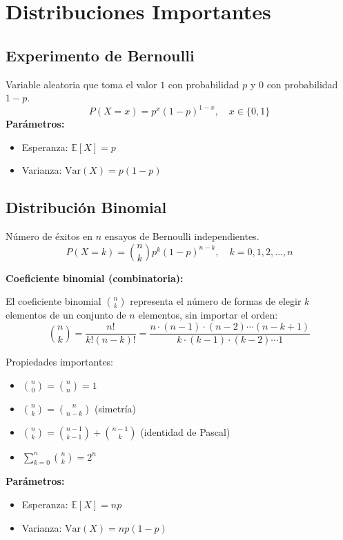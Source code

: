 \documentclass[12pt,a4paper]{article}
\begin{document}
\section{Distribuciones Importantes}
\subsection{Experimento de Bernoulli}
Variable aleatoria que toma el valor $1$ con probabilidad $p$ y $0$ con probabilidad $1-p$.
\begin{equation}
    P(X=x) = p^x (1-p)^{1-x}, \quad x \in \{0,1\}
\end{equation}
\textbf{Parámetros:}
\begin{itemize}
    \item Esperanza: $\mathbb{E}[X] = p$
    \item Varianza: $\mathrm{Var}(X) = p(1-p)$
\end{itemize}

\subsection{Distribución Binomial}
Número de éxitos en $n$ ensayos de Bernoulli independientes.
\begin{equation}
    P(X=k) = \binom{n}{k} p^k (1-p)^{n-k}, \quad k = 0, 1, 2, \ldots, n
\end{equation}

\textbf{Coeficiente binomial (combinatoria):}

El coeficiente binomial $\binom{n}{k}$ representa el número de formas de elegir $k$ elementos de un conjunto de $n$ elementos, sin importar el orden:
\begin{equation}
    \binom{n}{k} = \frac{n!}{k!(n-k)!} = \frac{n \cdot (n-1) \cdot (n-2) \cdots (n-k+1)}{k \cdot (k-1) \cdot (k-2) \cdots 1}
\end{equation}

Propiedades importantes:
\begin{itemize}
    \item $\binom{n}{0} = \binom{n}{n} = 1$
    \item $\binom{n}{k} = \binom{n}{n-k}$ (simetría)
    \item $\binom{n}{k} = \binom{n-1}{k-1} + \binom{n-1}{k}$ (identidad de Pascal)
    \item $\sum_{k=0}^{n} \binom{n}{k} = 2^n$
\end{itemize}

\textbf{Parámetros:}
\begin{itemize}
    \item Esperanza: $\mathbb{E}[X] = np$
    \item Varianza: $\mathrm{Var}(X) = np(1-p)$
\end{itemize}
\end{document}
